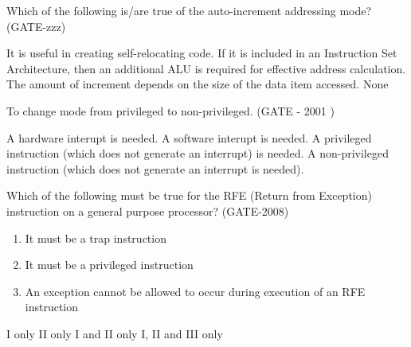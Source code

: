 \begin{questyle}
  \question  Which of the following is/are true of the auto-increment addressing mode?  (GATE-zzz)

  \begin{choices}
    \choice         It is useful in creating self-relocating code.
    \choice         If it is included in an Instruction Set Architecture, then an additional ALU is required
                    for effective address calculation.
    \CorrectChoice  The amount of increment depends on the size of the data item accessed.
    \choice         None
  \end{choices}
\end{questyle}

\begin{questyle}

  \question To change mode from privileged to non-privileged. (GATE - 2001 )

  \begin{choices}
    \choice A hardware interupt is needed.
    \choice A software interupt is needed.
    \choice A privileged instruction (which does not generate an interrupt) is needed.
    \CorrectChoice A non-privileged instruction (which does not generate an interrupt is needed).
  \end{choices}

  \end{questyle}


\begin{questyle}
  \question  Which of the following must be true for the RFE (Return from Exception) instruction
             on a general purpose processor?  (GATE-2008)

             \begin{enumerate}
                  \item It must be a trap instruction
                  \item It must be a privileged instruction
                  \item An exception cannot be allowed to occur during execution of an RFE instruction
              \end{enumerate}

  \begin{oneparchoices}
    \choice         I only
    \choice         II only
    \choice         I and II only
    \CorrectChoice  I, II and III only
  \end{oneparchoices}
\end{questyle}


